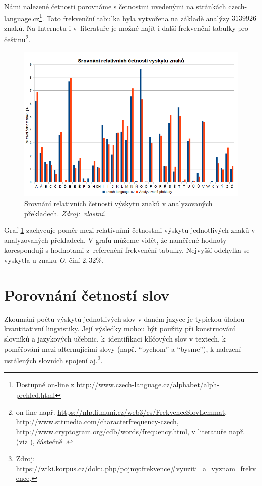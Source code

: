 \documentclass[dp.tex]{subfiles}
\begin{document}
Námi nalezené četnosti porovnáme s četnostmi uvedenými na stránkách czech-language.cz\footnote{Dostupné on-line z \url{http://www.czech-language.cz/alphabet/alph-prehled.html}}. Tato frekvenční tabulka byla vytvořena na základě analýzy $3 139 926$ znaků. Na Internetu i v~literatuře je možné najít i další frekvenční tabulky pro češtinu\footnote{on-line např. \url{https://nlp.fi.muni.cz/web3/cs/FrekvenceSlovLemmat}, \url{http://www.sttmedia.com/characterfrequency-czech}, \url{http://www.cryptogram.org/cdb/words/frequency.html}, v literatuře např.  (viz \cite{Kraus1965}), částečně  \cite[str.~109-121]{Tesitelova1987}.}.

\begin{figure}[h!]
	\centering
	\includegraphics[max width=\textwidth,keepaspectratio=true]{imgs-70-prakticka/cetnost-znaku2}
	\caption[Srovnání relativních četností výskytu znaků v analyzovaných překladech.]{Srovnání relativních četností výskytu znaků v analyzovaných překladech. \textit{Zdroj:~vlastní.}}
	\label{fig:character-freq}
\end{figure}

Graf \ref{fig:character-freq} zachycuje poměr mezi relativními četnostmi výskytu jednotlivých znaků v analyzovaných překladech. V grafu můžeme vidět, že naměřené hodnoty korespondují s hodnotami z~referenční frekvenční tabulky. Nejvyšší odchylka se vyskytla u znaku \textit{O}, činí $2{,}32 \%$.

\section{Porovnání četností slov}

Zkoumání počtu výskytů jednotlivých slov v daném jazyce je typickou úlohou kvantitativní lingvistiky. Její výsledky mohou být použity při konstruování slovníků a jazykových učebnic, k~identifikaci klíčových slov v textech, k poměřování mezi alternujícími slovy (např. \enquote{bychom} a \enquote{bysme}), k nalezení ustálených slovních spojení aj.\footnote{Zdroj: \url{https://wiki.korpus.cz/doku.php/pojmy:frekvence\#vyuziti_a_vyznam_frekvence}.}.
\end{document}
